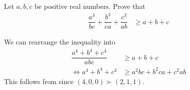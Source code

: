 \documentclass[inequalities.tex]{subfile}
\begin{document}
		\begin{problem}
			Let $a,b,c$ be positive real numbers. Prove that
				\begin{align*}
					\dfrac{a^{3}}{bc}+\dfrac{b^{3}}{ca}+\dfrac{c^{3}}{ab}
						& \geq a+b+c
				\end{align*}
			
				\begin{solution}
					We can rearrange the inequality into
						\begin{align*}
							\dfrac{a^{4}+b^{4}+c^{4}}{abc}
								& \geq a+b+c\\
							\iff a^{4}+b^{4}+c^{4}
								& \geq a^{2}bc+b^2ca+c^{2}ab
						\end{align*}
					This follows from  since $(4,0,0)\succ(2,1,1)$.
				\end{solution}
		\end{problem}
\end{document}

